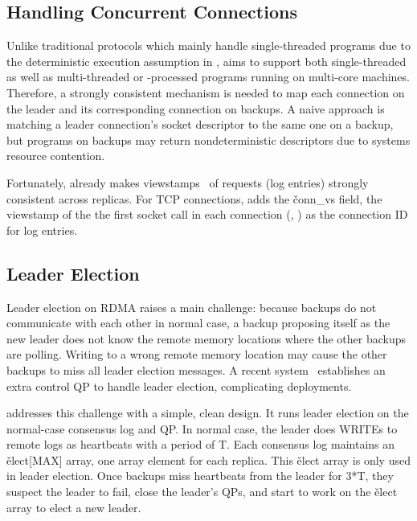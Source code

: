 \subsection{Handling Concurrent Connections} \label{sec:concurrent}

Unlike traditional \paxos protocols which mainly handle single-threaded 
programs due to the deterministic execution assumption in \smr, \xxx aims 
to support both single-threaded as well as multi-threaded or -processed 
programs running on multi-core machines. Therefore, a strongly consistent 
mechanism is needed to map each connection on the leader and 
its corresponding connection on backups. A naive approach is matching a 
leader connection's socket descriptor to the same one on a backup, but programs 
on backups may return nondeterministic descriptors due to systems resource 
contention.

Fortunately, \paxos already makes viewstamps~\cite{paxos:practical} of 
requests (log entries) strongly consistent across replicas. For TCP 
connections, \xxx adds the \v{conn\_vs} field, the viewstamp of the the first 
socket call in each connection (\ie, \accept) as the connection ID for log 
entries.

\subsection{Leader Election} \label{sec:election}

Leader election on RDMA raises a main challenge: because backups do not 
communicate with each other in normal case, a backup proposing itself as 
the new leader does not know the remote memory locations where the other 
backups are polling. Writing to a wrong remote memory location may cause the 
other backups to miss all leader election messages. A recent 
system~\cite{dare:hpdc15} establishes an extra control QP to handle leader 
election, complicating deployments.

\xxx addresses this challenge with a simple, clean design. It runs leader 
election on the normal-case consensus log and QP. In normal case, the 
leader does WRITEs to remote logs as heartbeats with a period of T. Each 
consensus log maintains an \v{elect[MAX]} array, one array
element for each replica. This \v{elect} array is only used in leader election. 
Once backups miss heartbeats from the leader for 3*T, they suspect the leader 
to fail, close the leader's QPs, and start to work on the \v{elect} array to 
elect a new leader.

